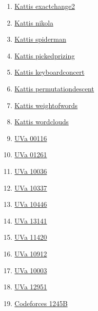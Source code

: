 \begin{enumerate}
\item \href{https://open.kattis.com/problems/exactchange2}{Kattis exactchange2}
\item \href{https://open.kattis.com/problems/nikola}{Kattis nikola}
\item \href{https://open.kattis.com/problems/spiderman}{Kattis spiderman}
\item \href{https://open.kattis.com/problems/pickedprizing}{Kattis pickedprizing}
\item \href{https://open.kattis.com/problems/keyboardconcert}{Kattis keyboardconcert}
\item \href{https://open.kattis.com/problems/permutationdescent}{Kattis permutationdescent}
\item \href{https://open.kattis.com/problems/weightofwords}{Kattis weightofwords}
\item \href{https://open.kattis.com/problems/wordclouds}{Kattis wordclouds}
\item \href{https://onlinejudge.org/index.php?option=com_onlinejudge&Itemid=8&page=show_problem&problem=52}{UVa 00116}
\item \href{https://onlinejudge.org/index.php?option=com_onlinejudge&Itemid=8&page=show_problem&problem=3702}{UVa 01261}
\item \href{https://onlinejudge.org/index.php?option=com_onlinejudge&Itemid=8&page=show_problem&problem=977}{UVa 10036}
\item \href{https://onlinejudge.org/index.php?option=com_onlinejudge&Itemid=8&page=show_problem&problem=1278}{UVa 10337}
\item \href{https://onlinejudge.org/index.php?option=com_onlinejudge&Itemid=8&page=show_problem&problem=1387}{UVa 10446}
\item \href{https://onlinejudge.org/index.php?option=com_onlinejudge&Itemid=8&page=show_problem&problem=5052}{UVa 13141}
\item \href{https://onlinejudge.org/index.php?option=com_onlinejudge&Itemid=8&page=show_problem&problem=2415}{UVa 11420}
\item \href{https://onlinejudge.org/index.php?option=com_onlinejudge&Itemid=8&page=show_problem&problem=1853}{UVa 10912}
\item \href{https://onlinejudge.org/index.php?option=com_onlinejudge&Itemid=8&page=show_problem&problem=944}{UVa 10003}
\item \href{https://onlinejudge.org/index.php?option=com_onlinejudge&Itemid=8&page=show_problem&problem=4830}{UVa 12951}
\item \href{https://codeforces.com/problemset/problem/1245/B}{Codeforces 1245B}
\end{enumerate}
